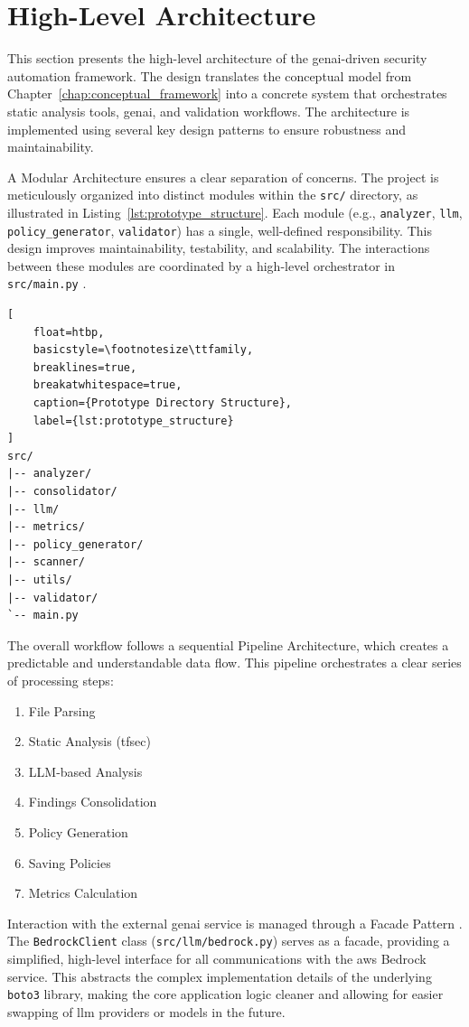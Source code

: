\section{High-Level Architecture}

This section presents the high-level architecture of the \gls{genai}-driven security automation framework. The design translates the conceptual model from Chapter~\ref{chap:conceptual_framework} into a concrete system that orchestrates static analysis tools, \gls{genai}, and validation workflows. The architecture is implemented using several key design patterns to ensure robustness and maintainability.

A Modular Architecture ensures a clear separation of concerns. The project is meticulously organized into distinct modules within the \texttt{src/} directory, as illustrated in Listing~\ref{lst:prototype_structure}. Each module (e.g., \texttt{analyzer}, \texttt{llm}, \texttt{policy\_generator}, \texttt{validator}) has a single, well-defined responsibility. This design improves maintainability, testability, and scalability. The interactions between these modules are coordinated by a high-level orchestrator in \texttt{src/main.py} \cite{martin_clean_2009}.

\begin{lstlisting}[
    float=htbp,
    basicstyle=\footnotesize\ttfamily, 
    breaklines=true,
    breakatwhitespace=true,
    caption={Prototype Directory Structure},
    label={lst:prototype_structure}
]
src/
|-- analyzer/
|-- consolidator/
|-- llm/
|-- metrics/
|-- policy_generator/
|-- scanner/
|-- utils/
|-- validator/
`-- main.py
\end{lstlisting}

The overall workflow follows a sequential Pipeline Architecture, which creates a predictable and understandable data flow. This pipeline orchestrates a clear series of processing steps:
\begin{enumerate}
\item File Parsing
\item Static Analysis (tfsec)
\item LLM-based Analysis
\item Findings Consolidation
\item Policy Generation
\item Saving Policies
\item Metrics Calculation
\end{enumerate}

Interaction with the external \gls{genai} service is managed through a Facade Pattern \cite{gamma_design_2011}. The \texttt{BedrockClient} class (\texttt{src/llm/bedrock.py}) serves as a facade, providing a simplified, high-level interface for all communications with the \gls{aws} Bedrock service. This abstracts the complex implementation details of the underlying \texttt{boto3} library, making the core application logic cleaner and allowing for easier swapping of \gls{llm} providers or models in the future.

